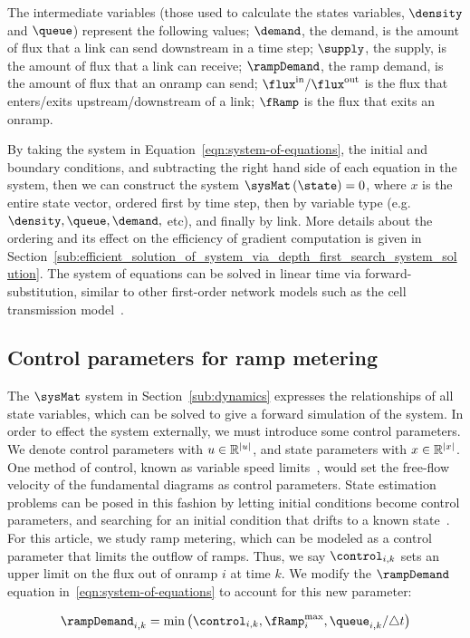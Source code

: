 
The intermediate variables (those used to calculate the states variables, $\density$ and $\queue$) represent the following values; $\demand$, the demand, is the amount of flux that a link can send downstream in a time step; $\supply$, the supply, is the amount of flux that a link can receive; $\rampDemand$, the ramp demand, is the amount of flux that an onramp can send; $\fIn/\fOut$ is the flux that enters/exits upstream/downstream of a link; $\fRamp$ is the flux that exits an onramp.

By taking the system in Equation~\eqref{eqn:system-of-equations}, the initial and boundary conditions, and subtracting the right hand side of each equation in the system, then we can construct the system $\sysMat \left( \state \right) = 0$, where $x$ is the entire state vector, ordered first by time step, then by variable type (e.g. $\density, \queue, \demand,$ etc), and finally by link. More details about the ordering and its effect on the efficiency of gradient computation is given in Section~\ref{sub:efficient_solution_of_system_via_depth_first_search_system_solution}. The system of equations can be solved in linear time via forward-substitution, similar to other first-order network models such as the cell transmission model~\cite{daganzo1995cell}.

\subsection{Control parameters for ramp metering} %
\label{sub:control_parameters_for_ramp_metering}

The $\sysMat$ system in Section~\ref{sub:dynamics} expresses the relationships of all state variables, which can be solved to give a forward simulation of the system. In order to effect the system externally, we must introduce some control parameters. We denote control parameters with $u\in\mathbb{R}^{|u|}$, and state parameters with $x\in\mathbb{R}^{|x|}$. One method of control, known as variable speed limits~\cite{Muralidharan2009}, would set the free-flow velocity of the fundamental diagrams as control parameters. State estimation problems can be posed in this fashion by letting initial conditions become control parameters, and searching for an initial condition that drifts to a known state~\cite{Jacquet}. For this article, we study ramp metering, which can be modeled as a control parameter that limits the outflow of ramps. Thus, we say $\idx{\control}{i}{k}$ sets an upper limit on the flux out of onramp $i$ at time $k$. We modify the $\rampDemand$ equation in~\eqref{eqn:system-of-equations} to account for this new parameter:

\begin{equation}
\label{eqn:modified-ramp-demand}
\idx{\rampDemand}{i}{k} = 
\min\left( \idx{\control}{i}{k}, \rampMax_i, \idx{\queue}{i}{k} / \dt \right)
\end{equation}



